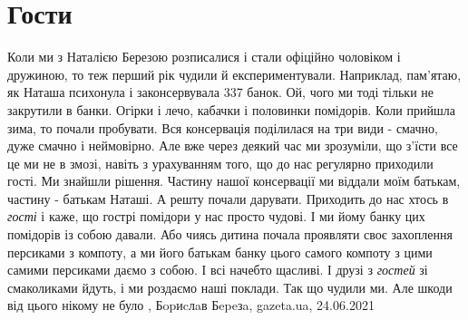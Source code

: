  
 
 
 
 
\chapter{Гости}

Коли ми з Наталією Березою розписалися і стали офіційно чоловіком і дружиною,
то теж перший рік чудили й експериментували. Наприклад, пам'ятаю, як Наташа
психонула і законсервувала 337 банок. Ой, чого ми тоді тільки не закрутили в
банки. Огірки і лечо, кабачки і половинки помідорів. Коли прийшла зима, то
почали пробувати. Вся консервація поділилася на три види - смачно, дуже смачно
і неймовірно. Але вже через деякий час ми зрозуміли, що з'їсти все це ми не в
змозі, навіть з урахуванням того, що до нас регулярно приходили гості. Ми
знайшли рішення. Частину нашої консервації ми віддали моїм батькам, частину -
батькам Наташі. А решту почали дарувати. Приходить до нас хтось в \emph{гості} і каже,
що гострі помідори у нас просто чудові. І ми йому банку цих помідорів із собою
давали. Або чиясь дитина почала проявляти своє захоплення персиками з компоту,
а ми його батькам банку цього самого компоту з цими самими персиками даємо з
собою. І всі начебто щасливі. І друзі з \emph{гостей} зі смаколиками йдуть, і ми
роздаємо наші поклади. Так що чудили ми. Але шкоди від цього нікому не було
, 
Бopиcлaв Бepeзa, gazeta.ua, 24.06.2021
